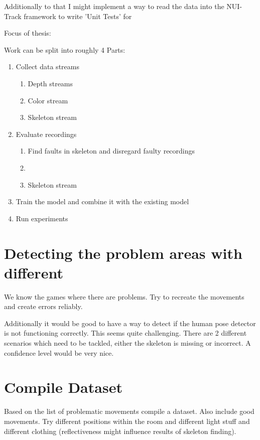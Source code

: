 Additionally to that I might implement a way to read the data into the NUI-Track framework to write 'Unit Tests' for 

\clearpage

Focus of thesis: 

Work can be split into roughly 4 Parts:

\begin{enumerate}
    \item Collect data streams
    \begin{enumerate}
        \item Depth streams
        \item Color stream
        \item Skeleton stream
    \end{enumerate}
    \item Evaluate recordings
    \begin{enumerate}
        \item Find faults in skeleton and disregard faulty recordings
        \item 
        \item Skeleton stream
    \end{enumerate}
    \item Train the model and combine it with the existing model
    \item Run experiments
\end{enumerate}

\section{Detecting the problem areas with different}

We know the games where there are problems. Try to recreate the movements and create errors reliably.

Additionally it would be good to have a way to detect if the human pose detector is not functioning correctly. This seems quite challenging. There are 2 different scenarios which need to be tackled, either the skeleton is missing or incorrect. A confidence level would be very nice.

\section{Compile Dataset}

Based on the list of problematic movements compile a dataset. Also include good movements. Try different positions within the room and different light stuff and different clothing (reflectiveness might influence results of skeleton finding).


